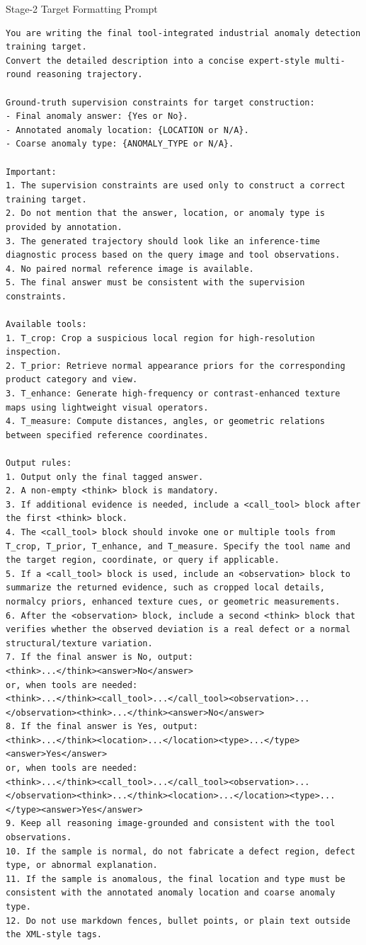 \documentclass{llmxive}
\begin{document}
{\begin{promptbox}{Stage-2 Target Formatting Prompt}
\begin{lstlisting}[style=promptstyle]
You are writing the final tool-integrated industrial anomaly detection training target.
Convert the detailed description into a concise expert-style multi-round reasoning trajectory.

Ground-truth supervision constraints for target construction:
- Final anomaly answer: {Yes or No}.
- Annotated anomaly location: {LOCATION or N/A}.
- Coarse anomaly type: {ANOMALY_TYPE or N/A}.

Important:
1. The supervision constraints are used only to construct a correct training target.
2. Do not mention that the answer, location, or anomaly type is provided by annotation.
3. The generated trajectory should look like an inference-time diagnostic process based on the query image and tool observations.
4. No paired normal reference image is available.
5. The final answer must be consistent with the supervision constraints.

Available tools:
1. T_crop: Crop a suspicious local region for high-resolution inspection.
2. T_prior: Retrieve normal appearance priors for the corresponding product category and view.
3. T_enhance: Generate high-frequency or contrast-enhanced texture maps using lightweight visual operators.
4. T_measure: Compute distances, angles, or geometric relations between specified reference coordinates.

Output rules:
1. Output only the final tagged answer.
2. A non-empty <think> block is mandatory.
3. If additional evidence is needed, include a <call_tool> block after the first <think> block.
4. The <call_tool> block should invoke one or multiple tools from T_crop, T_prior, T_enhance, and T_measure. Specify the tool name and the target region, coordinate, or query if applicable.
5. If a <call_tool> block is used, include an <observation> block to summarize the returned evidence, such as cropped local details, normalcy priors, enhanced texture cues, or geometric measurements.
6. After the <observation> block, include a second <think> block that verifies whether the observed deviation is a real defect or a normal structural/texture variation.
7. If the final answer is No, output:
<think>...</think><answer>No</answer>
or, when tools are needed:
<think>...</think><call_tool>...</call_tool><observation>...</observation><think>...</think><answer>No</answer>
8. If the final answer is Yes, output:
<think>...</think><location>...</location><type>...</type><answer>Yes</answer>
or, when tools are needed:
<think>...</think><call_tool>...</call_tool><observation>...</observation><think>...</think><location>...</location><type>...</type><answer>Yes</answer>
9. Keep all reasoning image-grounded and consistent with the tool observations.
10. If the sample is normal, do not fabricate a defect region, defect type, or abnormal explanation.
11. If the sample is anomalous, the final location and type must be consistent with the annotated anomaly location and coarse anomaly type.
12. Do not use markdown fences, bullet points, or plain text outside the XML-style tags.
\end{lstlisting}
\end{promptbox}

}
\end{document}
